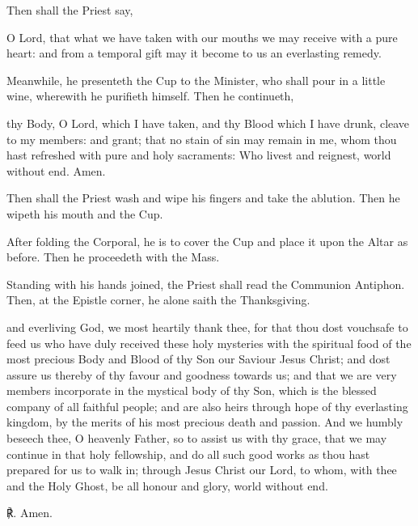 \begin{rubric}
    Then shall the Priest say,
\end{rubric}
 O Lord, that what we have taken with our mouths we may receive with a pure heart: and from a temporal gift may it become to us an everlasting remedy.
\begin{rubric}
    Meanwhile, he presenteth the Cup to the Minister, who shall pour in a little wine, wherewith he purifieth himself. Then he continueth,    
\end{rubric}
 thy Body, O Lord, which I have taken, and thy Blood which I have drunk, cleave to my members: and grant; that no stain of sin may remain in me, whom thou hast refreshed with pure and holy sacraments: Who livest and reignest, world without end. Amen.
\begin{rubric}
    Then shall the Priest wash and wipe his fingers and take the ablution. Then he wipeth his mouth and the Cup.
\end{rubric}
\begin{rubric}
	After folding the Corporal, he is to cover the Cup and place it upon the Altar as before. Then he proceedeth with the Mass.
\end{rubric}
\begin{rubric}
    Standing with his hands joined, the Priest shall read the Communion Antiphon. Then, at the Epistle corner, he alone saith the Thanksgiving.
\end{rubric}
{} and everliving God, we most heartily thank thee, for that thou dost vouchsafe to feed us who have duly received these holy mysteries with the spiritual food of the most precious Body and Blood of thy Son our Saviour Jesus Christ; and dost assure us thereby of thy favour and goodness towards us; and that we are very members incorporate in the mystical body of thy Son, which is the blessed company of all faithful people; and are also heirs through hope of thy everlasting kingdom, by the merits of his most precious death and passion. And we humbly beseech thee, O heavenly Father, so to assist us with thy grace, that we may continue in that holy fellowship, and do all such good works as thou hast prepared for us to walk in; through Jesus Christ our Lord, to whom, with thee and the Holy Ghost, be all honour and glory, world without end.\par
℟. Amen.


